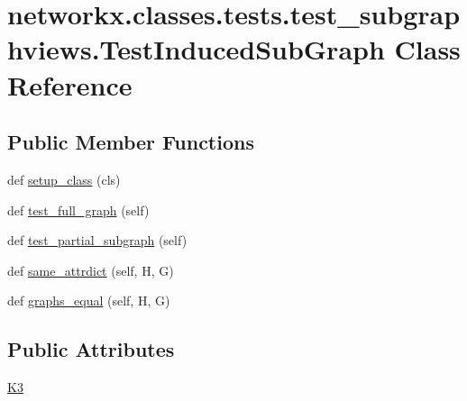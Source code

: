 \hypertarget{classnetworkx_1_1classes_1_1tests_1_1test__subgraphviews_1_1TestInducedSubGraph}{}\section{networkx.\+classes.\+tests.\+test\+\_\+subgraphviews.\+Test\+Induced\+Sub\+Graph Class Reference}
\label{classnetworkx_1_1classes_1_1tests_1_1test__subgraphviews_1_1TestInducedSubGraph}
\subsection*{Public Member Functions}
\begin{DoxyCompactItemize}
\item 
def \hyperlink{classnetworkx_1_1classes_1_1tests_1_1test__subgraphviews_1_1TestInducedSubGraph_a87744ca4d4de985ddf75cb7450d36875}{setup\+\_\+class} (cls)
\item 
def \hyperlink{classnetworkx_1_1classes_1_1tests_1_1test__subgraphviews_1_1TestInducedSubGraph_a30caa82879b6623b7d58292cee734a9f}{test\+\_\+full\+\_\+graph} (self)
\item 
def \hyperlink{classnetworkx_1_1classes_1_1tests_1_1test__subgraphviews_1_1TestInducedSubGraph_aa99288972adae65c0d9f3886183bf069}{test\+\_\+partial\+\_\+subgraph} (self)
\item 
def \hyperlink{classnetworkx_1_1classes_1_1tests_1_1test__subgraphviews_1_1TestInducedSubGraph_ac1174f822554cdd057d26854aac36c3d}{same\+\_\+attrdict} (self, H, G)
\item 
def \hyperlink{classnetworkx_1_1classes_1_1tests_1_1test__subgraphviews_1_1TestInducedSubGraph_aac7cceb936321aca503be65135fc1d37}{graphs\+\_\+equal} (self, H, G)
\end{DoxyCompactItemize}
\subsection*{Public Attributes}
\begin{DoxyCompactItemize}
\item 
\hyperlink{classnetworkx_1_1classes_1_1tests_1_1test__subgraphviews_1_1TestInducedSubGraph_a51d812a4b1714f9f10a5b8f543653725}{K3}
\end{DoxyCompactItemize}


